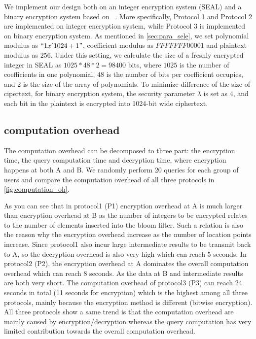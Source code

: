 We implement our design both on an integer encryption system (SEAL) and a binary encryption system based on ~\cite{van2010fully}. More specifically, Protocol 1 and Protocol 2 are implemented on integer encryption system, while Protocol 3 is implemented on binary encryption system. As mentioned in \ref{sec:para_sele}, we set polynomial modulus as $``1x \,\hat{}\, 1024 + 1"$, coefficient modulus as $FFFFFFF00001$ and plaintext modulus as $256$. Under this setting, we calculate the size of a freshly encrypted integer in SEAL as $1025*48*2 = 98400$ bits, where $1025$ is the number of coefficients in one polynomial, $48$ is the number of bits per coefficient occupies, and $2$ is the size of the array of polynomials. To minimize difference of the size of cipertext, for binary encryption system, the security parameter $\lambda$ is set as 4, and each bit in the plaintext is encrypted into 1024-bit wide ciphertext.

\subsection{computation overhead}
The computation overhead can be decomposed to three part: the encryption time, the query computation time and decryption time, where encryption happens at both A and B. We randomly perform 20 queries for each group of users and compare the computation overhead of all three protocols in \autoref{fig:computation_oh}. 

As you can see that in protocol1 (P1) encryption overhead at A is much larger than encryption overhead at B as the number of integers to be encrypted relates to the number of elements inserted into the bloom filter. Such a relation is also the reason why the encryption overhead increase as the number of location points increase. Since protocol1 also incur large intermediate results to be transmit back to A, so the decryption overhead is also very high which can reach 5 seconds. In protocol2 (P2), the encryption overhead at A dominates the overall computation overhead which can reach 8 seconds. As the data at B and intermediate results are both very short. The computation overhead of protocol3 (P3) can reach 24 seconds in total (11 seconds for encryption) which is the highest among all three protocols, mainly because the encryption method is different (bitwise encryption). All three protocols show a same trend is that the computation overhead are mainly caused by encryption/decryption whereas the query computation has very limited contribution towards the overall computation overhead.

